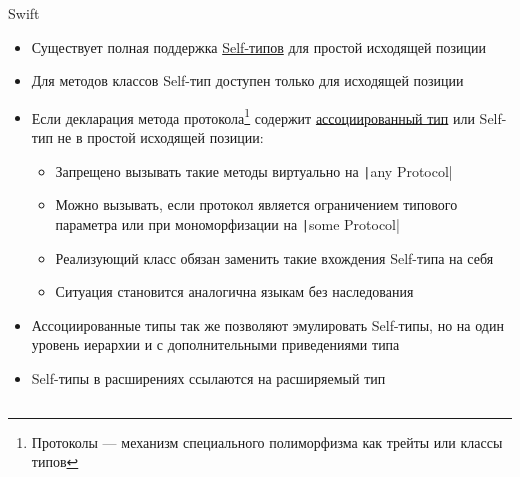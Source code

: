 \documentclass[aspectratio=169,usenames,dvipsnames]{beamer}
\begin{document}
    \begin{frame}{Swift}
        \begin{itemize}
            \item Существует полная поддержка \href{https://docs.swift.org/swift-book/documentation/the-swift-programming-language/types/\#Self-Type}{\color{blue}Self-типов} для простой исходящей позиции \pause
            \item Для методов классов Self-тип доступен только для исходящей позиции \pause
            \item Если декларация метода протокола\footnote{Протоколы --- механизм специального полиморфизма как трейты или классы типов} содержит \href{https://docs.swift.org/swift-book/documentation/the-swift-programming-language/generics/\#Associated-Types}{\color{blue}ассоциированный тип} или Self-тип не в простой исходящей позиции: \pause
            \begin{itemize}
                \item Запрещено вызывать такие методы виртуально на \texttt|any Protocol|
                \item Можно вызывать, если протокол является ограничением типового параметра или при мономорфизации на \texttt|some Protocol|
                \item Реализующий класс обязан заменить такие вхождения Self-типа на себя
                \item Ситуация становится аналогична языкам без наследования
            \end{itemize} \pause
            \item Ассоциированные типы так же позволяют эмулировать Self-типы, но на один уровень иерархии и с дополнительными приведениями типа \pause
            \item Self-типы в расширениях ссылаются на расширяемый тип
        \end{itemize}
    \end{frame}

    \subsection{}
\end{document}
